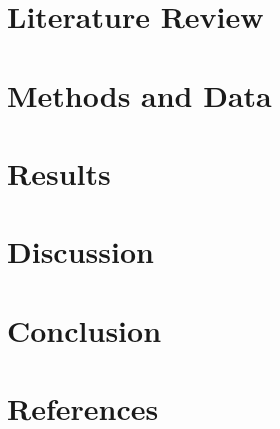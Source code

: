 \documentclass[10pt]{iopart}
\begin{document}
\section{Literature Review}


\section{Methods and Data}
\label{section:methods_data}


\section{Results}
\label{section:results}

\section{Discussion}
\label{section:discussion}


\section{Conclusion}


% 
\section*{References}



 
\end{document}
